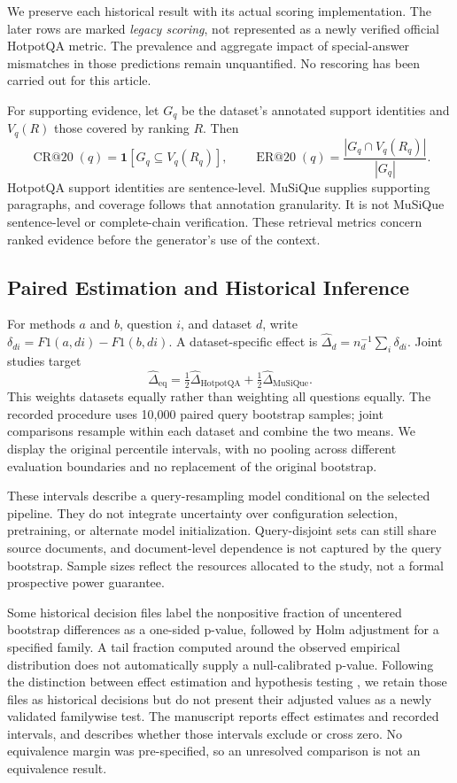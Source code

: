\documentclass[11pt,a4paper]{article}
\begin{document}
We preserve each historical result with its actual scoring implementation.
The later rows are marked \emph{legacy scoring}, not represented as a newly
verified official HotpotQA metric. The prevalence and aggregate impact of
special-answer mismatches in those predictions remain unquantified.
No rescoring has been carried out for this article.

For supporting evidence, let $G_q$ be the dataset's annotated support
identities and $V_q(R)$ those covered by ranking $R$. Then
\begin{equation}
\operatorname{CR@20}(q)=\mathbf{1}[G_q\subseteq V_q(R_q)],\qquad
\operatorname{ER@20}(q)=\frac{|G_q\cap V_q(R_q)|}{|G_q|}.
\end{equation}
HotpotQA support identities are sentence-level. MuSiQue supplies supporting
paragraphs, and coverage follows that annotation granularity. It is not
MuSiQue sentence-level or complete-chain verification. These retrieval
metrics concern ranked evidence before the generator's use of the context.

\subsection{Paired Estimation and Historical Inference}
For methods $a$ and $b$, question $i$, and dataset $d$, write
$\delta_{di}=F1(a,di)-F1(b,di)$. A dataset-specific effect is
$\hat\Delta_d=n_d^{-1}\sum_i\delta_{di}$. Joint studies target
\begin{equation}
\hat\Delta_{\mathrm{eq}}=\tfrac12\hat\Delta_{\mathrm{HotpotQA}}
                       +\tfrac12\hat\Delta_{\mathrm{MuSiQue}}.
\end{equation}
This weights datasets equally rather than weighting all questions equally.
The recorded procedure uses 10,000 paired query bootstrap samples; joint
comparisons resample within each dataset and combine the two means. We
display the original percentile intervals, with no pooling across different
evaluation boundaries and no replacement of the original bootstrap.

These intervals describe a query-resampling model conditional on the selected
pipeline. They do not integrate uncertainty over configuration selection,
pretraining, or alternate model initialization. Query-disjoint sets can still
share source documents, and document-level dependence is not captured by the
query bootstrap. Sample sizes reflect the resources allocated to the study,
not a formal prospective power guarantee.

Some historical decision files label the nonpositive fraction of uncentered
bootstrap differences as a one-sided p-value, followed by Holm adjustment for
a specified family. A tail fraction computed around the observed empirical
distribution does not automatically supply a null-calibrated p-value.
Following the distinction between effect estimation and hypothesis testing
\citep{dror2018hitchhiker}, we retain those files as historical decisions but
do not present their adjusted values as a newly validated familywise test.
The manuscript reports effect estimates and recorded intervals, and describes
whether those intervals exclude or cross zero. No equivalence margin was
pre-specified, so an unresolved comparison is not an equivalence result.
\end{document}
